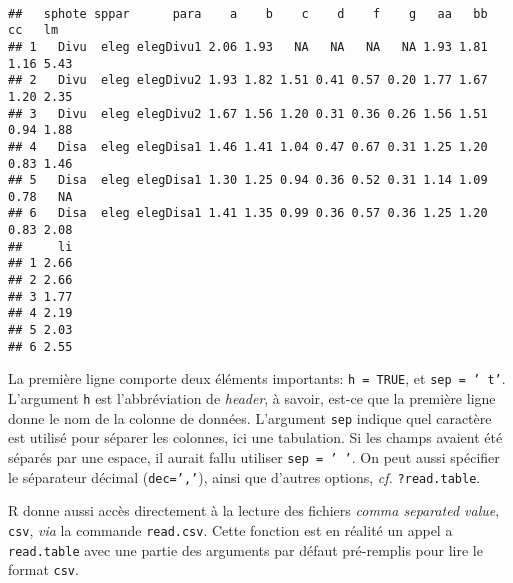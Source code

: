 \begin{knitrout}
\color{fgcolor}\begin{kframe}
\begin{flushleft}
\ttfamily\noindent
{}\hlassignement{\usebox{\hlnormalsizeboxlessthan}-}{\ }\hlkeyword{(}\hlkeyword{,}{\ }\hlargument{=}{\ }\hlkeyword{,}{\ }\hlargument{=}{\ }\hlkeyword{)}\hspace*{\fill}\\
\hlstd{}\hlkeyword{(}\hlkeyword{)}\mbox{}
\normalfont
\end{flushleft}
\begin{verbatim}
##   sphote sppar      para    a    b    c    d    f    g   aa   bb   cc   lm
## 1   Divu  eleg elegDivu1 2.06 1.93   NA   NA   NA   NA 1.93 1.81 1.16 5.43
## 2   Divu  eleg elegDivu2 1.93 1.82 1.51 0.41 0.57 0.20 1.77 1.67 1.20 2.35
## 3   Divu  eleg elegDivu2 1.67 1.56 1.20 0.31 0.36 0.26 1.56 1.51 0.94 1.88
## 4   Disa  eleg elegDisa1 1.46 1.41 1.04 0.47 0.67 0.31 1.25 1.20 0.83 1.46
## 5   Disa  eleg elegDisa1 1.30 1.25 0.94 0.36 0.52 0.31 1.14 1.09 0.78   NA
## 6   Disa  eleg elegDisa1 1.41 1.35 0.99 0.36 0.57 0.36 1.25 1.20 0.83 2.08
##     li
## 1 2.66
## 2 2.66
## 3 1.77
## 4 2.19
## 5 2.03
## 6 2.55
\end{verbatim}
\end{kframe}
\end{knitrout}


La première ligne comporte deux éléments importants: \texttt{h = TRUE}, et \texttt{sep = '\ t'}.
L'argument \texttt{h} est l'abbréviation de \emph{header}, à savoir, est-ce que la première ligne donne le nom de la colonne de données.
L'argument \texttt{sep} indique quel caractère est utilisé pour séparer les colonnes, ici une tabulation.
Si les champs avaient été séparés par une espace, il aurait fallu utiliser \texttt{sep = ' '}.
On peut aussi spécifier le séparateur décimal (\texttt{dec=','}), ainsi que d'autres options, \emph{cf.} \texttt{?read.table}.

R donne aussi accès directement à la lecture des fichiers \emph{comma separated value}, \texttt{csv}, \emph{via} la commande \texttt{read.csv}.
Cette fonction est en réalité un appel a \texttt{read.table} avec une partie des arguments par défaut pré-remplis pour lire le format \texttt{csv}.

